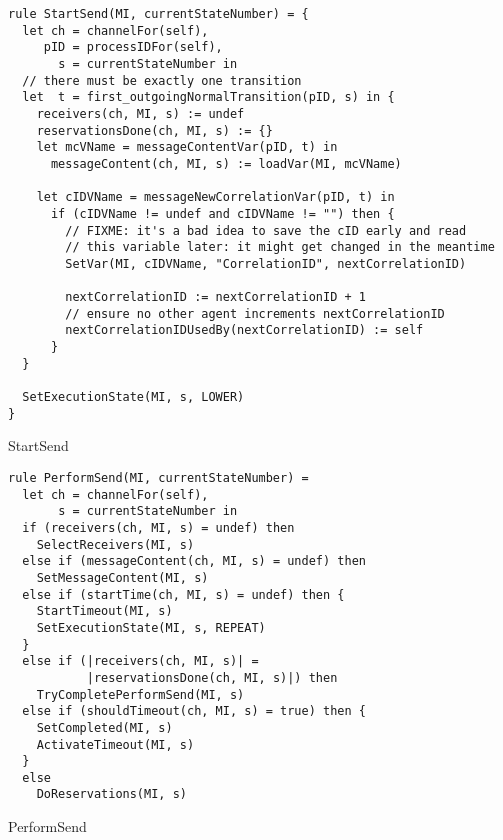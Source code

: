 \begin{listing}[H]
\begin{verbatim}
rule StartSend(MI, currentStateNumber) = {
  let ch = channelFor(self),
     pID = processIDFor(self),
       s = currentStateNumber in
  // there must be exactly one transition
  let  t = first_outgoingNormalTransition(pID, s) in {
    receivers(ch, MI, s) := undef
    reservationsDone(ch, MI, s) := {}
    let mcVName = messageContentVar(pID, t) in
      messageContent(ch, MI, s) := loadVar(MI, mcVName)

    let cIDVName = messageNewCorrelationVar(pID, t) in
      if (cIDVName != undef and cIDVName != "") then {
        // FIXME: it's a bad idea to save the cID early and read
        // this variable later: it might get changed in the meantime
        SetVar(MI, cIDVName, "CorrelationID", nextCorrelationID)

        nextCorrelationID := nextCorrelationID + 1
        // ensure no other agent increments nextCorrelationID
        nextCorrelationIDUsedBy(nextCorrelationID) := self
      }
  }

  SetExecutionState(MI, s, LOWER)
}
\end{verbatim}
\caption{StartSend}
\label{lst:asm:StartSend}
\end{listing}




\begin{listing}[H]
\begin{verbatim}
rule PerformSend(MI, currentStateNumber) =
  let ch = channelFor(self),
       s = currentStateNumber in
  if (receivers(ch, MI, s) = undef) then
    SelectReceivers(MI, s)
  else if (messageContent(ch, MI, s) = undef) then
    SetMessageContent(MI, s)
  else if (startTime(ch, MI, s) = undef) then {
    StartTimeout(MI, s)
    SetExecutionState(MI, s, REPEAT)
  }
  else if (|receivers(ch, MI, s)| =
           |reservationsDone(ch, MI, s)|) then
    TryCompletePerformSend(MI, s)
  else if (shouldTimeout(ch, MI, s) = true) then {
    SetCompleted(MI, s)
    ActivateTimeout(MI, s)
  }
  else
    DoReservations(MI, s)
\end{verbatim}
\caption{PerformSend}
\label{lst:asm:PerformSend}
\end{listing}




